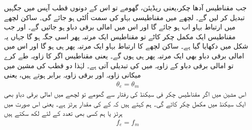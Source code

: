 جب مقناطیس آدھا چکر،یعنی  ریڈیئن،  گھومے تو اس کے دونوں  قطب آپس میں جگہیں تبدیل کر لیں گے۔ لچھے میں مقناطیسی بہاو کی سمت اُلٹی ہو جائے گی۔ ساکن لچھے میں ارتباط بہاو اب  ہو جائے گا اور اس میں امالی برقی دباو  ہو جائیں گے۔ اور جب مقناطیس ایک مکمل چکر کاٹے تو مقناطیس  ایک مرتبہ پھر اسی جگہ ہو گا جہاں یہ شکل میں دکھایا گیا ہے۔ ساکن لچھے کا ارتباط بہاو ایک مرتبہ پھر  ہی ہو گا اور اس میں امالی برقی دباو بھی ایک مرتبہ پھر  ہی ہوں گے۔ یعنی مقناطیس اگر  کا زاویہ طے کرے تو امالی برقی دباو کے زاویہ میں  کی تبدیلی آتی ہے۔ لہٰذا دو قطب کی مشین میں میکانی زاویہ  اور برقی زاویہ  برابر ہوتے ہیں، یعنی
\begin{align*}
\theta_e=\theta_m
\end{align*}
اس مشین میں اگر مقناطیس  چکر فی سیکنڈ کی رفتار سے گھومے تو لچھے میں امالی برقی دباو  بھی ایک سیکنڈ میں  مکمل چکر کاٹے گی۔ ہم کہتے ہیں کہ  کے     کی مقدار   ہرٹز ہے۔ یعنی اس صورت میں   ہرٹز  یا ہم کسی بھی تعدد کے لئے لکھ سکتے ہیں
\begin{align*}
f_e=f_m
\end{align*}
%
